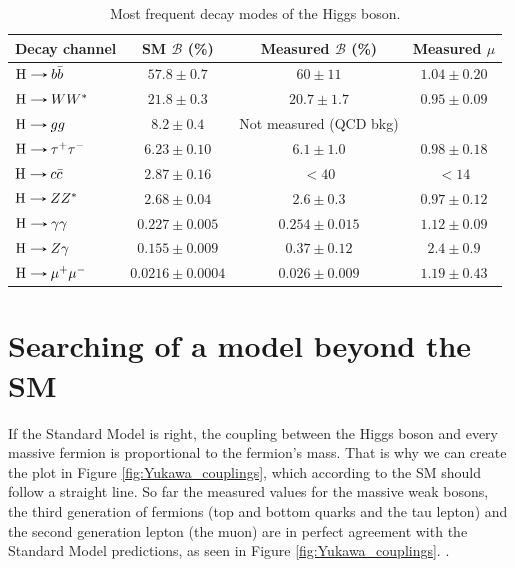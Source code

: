 \begin{table}[!ht]
    \centering
    \begin{tabular}{|l|c|c|c|}
        \hline
        \cellcolor{lightgray}Decay channel & \cellcolor{lightgray} SM $\mathcal{B}$ (\%) & \cellcolor{lightgray} Measured $\mathcal{B}$ (\%) & \cellcolor{lightgray} Measured $\mu$ \\ \hline
        $\text{H}\decaysto b\bar{b}$     & $57.8 \pm 0.7$        & $60 \pm 11$         & $1.04 \pm 0.20$ \cite{CMS:2018nsn}  \\
        $\text{H}\decaysto WW^*$         & $21.8 \pm 0.3$        & $20.7 \pm 1.7$      & $0.95 \pm 0.09$ \cite{CMS:2022uhn}  \\
        $\text{H}\decaysto gg$           & $8.2 \pm 0.4$         & Not measured (QCD bkg)    &   \\
        $\text{H}\decaysto \tau^+\tau^-$ & $6.23 \pm 0.10$       & $6.1 \pm 1.0$       & $0.98 \pm 0.18$ \cite{CMS:2017zyp}  \\
        $\text{H}\decaysto c\bar{c}$     & $2.87 \pm 0.16$       & $<40$               & $<14$ \cite{CMS:2022psv}            \\
        $\text{H}\decaysto ZZ^*$         & $2.68 \pm 0.04$       & $2.6 \pm 0.3$       & $0.97 \pm 0.12$ \cite{CMS:2022dwd}  \\
        $\text{H}\decaysto \gamma\gamma$ & $0.227 \pm 0.005$     & $0.254 \pm 0.015$   & $1.12 \pm 0.09$ \cite{CMS:2021kom}  \\
        $\text{H}\decaysto Z\gamma$      & $0.155 \pm 0.009$     & $0.37 \pm 0.12$     & $2.4 \pm 0.9$ \cite{CMS:2022ahq}    \\
        $\text{H}\decaysto \mu^+\mu^-$   & $0.0216 \pm 0.0004$   & $0.026 \pm 0.009$   & $1.19 \pm 0.43$ \cite{CMS:2020xwi}  \\ \hline
    \end{tabular}
    \caption{Most frequent decay modes of the Higgs boson.}
    \label{tab:Higgs_decays}
\end{table}

\section{Searching of a model beyond the SM}

If the Standard Model is right, the coupling between the Higgs boson and every massive fermion is proportional to the fermion's mass. That is why we can create the plot in Figure \ref{fig:Yukawa_couplings}, which according to the SM should follow a straight line. So far the measured values for the massive weak bosons, the third generation of fermions (top and bottom quarks and the tau lepton) and the second generation lepton (the muon) are in perfect agreement with the Standard Model predictions, as seen in Figure \ref{fig:Yukawa_couplings}. .

